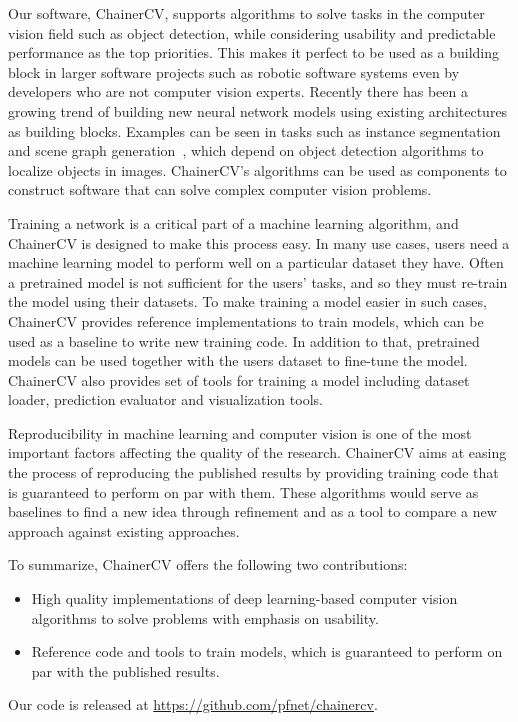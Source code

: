 \documentclass[sigconf]{acmart}
\begin{document}
Our software, ChainerCV, supports algorithms to solve tasks in the computer vision field such as object detection, while considering usability and predictable performance as the top priorities.
This makes it perfect to be used as a building block in larger software projects such as robotic software systems even by developers who are not computer vision experts.
Recently there has been a growing trend of building new neural network models using existing architectures as building blocks.
Examples can be seen in tasks such as instance segmentation~\cite{mask_rcnn} and scene graph generation~\cite{xu2017scenegraph}, which depend on object detection algorithms to localize objects in images. ChainerCV's algorithms can be used as components to construct software that can solve complex computer vision problems.


Training a network is a critical part of a machine learning algorithm, and ChainerCV is designed to make this process easy.
In many use cases, users need a machine learning model to perform well on a particular dataset they have.
Often a pretrained model is not sufficient for the users' tasks, and so they must re-train the model using their datasets.
To make training a model easier in such cases, ChainerCV provides reference implementations to train models, which can be used as a baseline to write new training code.
In addition to that, pretrained models can be used together with the users dataset to fine-tune the model.
ChainerCV also provides set of tools for training a model including dataset loader, prediction evaluator and visualization tools.

Reproducibility in machine learning and computer vision is one of the most important factors affecting the quality of the research.
ChainerCV aims at easing the process of reproducing the published results by providing training code that is guaranteed to perform on par with them.
These algorithms would serve as baselines to find a new idea through refinement and as a tool to compare a new approach against existing approaches.

To summarize, ChainerCV offers the following two contributions:
\begin{itemize}
  \item High quality implementations of deep learning-based computer vision algorithms to solve problems with emphasis on usability.
  \item Reference code and tools to train models, which is guaranteed to perform on par with the published results.
\end{itemize}
Our code is released at \url{https://github.com/pfnet/chainercv}.
\end{document}
